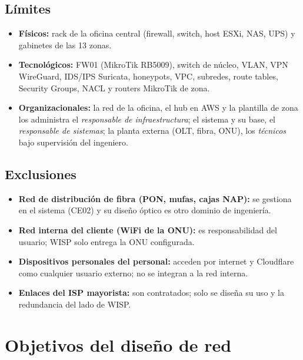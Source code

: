 \subsection{Límites}
\begin{itemize}
  \item \textbf{Físicos:} rack de la oficina central (firewall, switch, host ESXi,
  NAS, UPS) y gabinetes de las 13 zonas.
  \item \textbf{Tecnológicos:} FW01 (MikroTik RB5009), switch de núcleo, VLAN, VPN
  WireGuard, IDS/IPS Suricata, honeypots, VPC, subredes, route tables, Security
  Groups, NACL y routers MikroTik de zona.
  \item \textbf{Organizacionales:} la red de la oficina, el hub en AWS y la plantilla
  de zona los administra el \emph{responsable de infraestructura}; el sistema y su
  base, el \emph{responsable de sistemas}; la planta externa (OLT, fibra, ONU), los
  \emph{técnicos} bajo supervisión del ingeniero.
\end{itemize}

\subsection{Exclusiones}
\begin{itemize}
  \item \textbf{Red de distribución de fibra (PON, mufas, cajas NAP):} se gestiona en el
  sistema (CE02) y su diseño óptico es otro dominio de ingeniería.
  \item \textbf{Red interna del cliente (WiFi de la ONU):} es responsabilidad del
  usuario; WISP solo entrega la ONU configurada.
  \item \textbf{Dispositivos personales del personal:} acceden por internet y Cloudflare
  como cualquier usuario externo; no se integran a la red interna.
  \item \textbf{Enlaces del ISP mayorista:} son contratados; solo se diseña su uso y la
  redundancia del lado de WISP.
\end{itemize}

\section{Objetivos del diseño de red}


